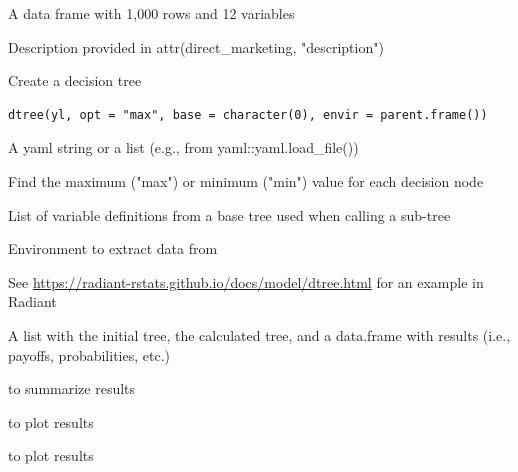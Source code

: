 \documentclass[a4paper]{book}
\begin{document}
%
\begin{Format}
A data frame with 1,000 rows and 12 variables
\end{Format}
%
\begin{Details}
Description provided in attr(direct\_marketing, "description")
\end{Details}
%
\begin{Description}
Create a decision tree
\end{Description}
%
\begin{Usage}
\begin{verbatim}
dtree(yl, opt = "max", base = character(0), envir = parent.frame())
\end{verbatim}
\end{Usage}
%
\begin{Arguments}
\begin{ldescription}
\item[\code{yl}] A yaml string or a list (e.g., from yaml::yaml.load\_file())

\item[\code{opt}] Find the maximum ("max") or minimum ("min") value for each decision node

\item[\code{base}] List of variable definitions from a base tree used when calling a sub-tree

\item[\code{envir}] Environment to extract data from
\end{ldescription}
\end{Arguments}
%
\begin{Details}
See \url{https://radiant-rstats.github.io/docs/model/dtree.html} for an example in Radiant
\end{Details}
%
\begin{Value}
A list with the initial tree, the calculated tree, and a data.frame with results (i.e., payoffs, probabilities, etc.)
\end{Value}
%
\begin{SeeAlso}
 to summarize results

 to plot results

 to plot results
\end{SeeAlso}
%
\begin{Examples}
\end{Examples}
\end{document}
